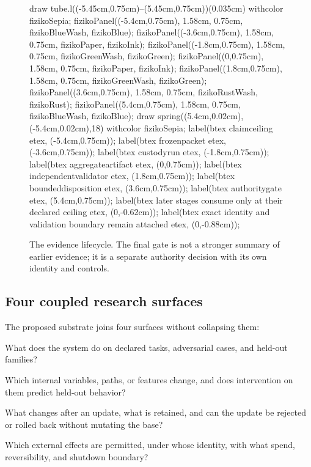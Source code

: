 \documentclass[11pt,twoside]{article}
\begin{document}
\begin{figure}[t]
\centering
\mpfig
  draw tube.l((-5.45cm,0.75cm)--(5.45cm,0.75cm))(0.035cm) withcolor fizikoSepia;
  fizikoPanel((-5.4cm,0.75cm), 1.58cm, 0.75cm, fizikoBlueWash, fizikoBlue);
  fizikoPanel((-3.6cm,0.75cm), 1.58cm, 0.75cm, fizikoPaper, fizikoInk);
  fizikoPanel((-1.8cm,0.75cm), 1.58cm, 0.75cm, fizikoGreenWash, fizikoGreen);
  fizikoPanel((0,0.75cm), 1.58cm, 0.75cm, fizikoPaper, fizikoInk);
  fizikoPanel((1.8cm,0.75cm), 1.58cm, 0.75cm, fizikoGreenWash, fizikoGreen);
  fizikoPanel((3.6cm,0.75cm), 1.58cm, 0.75cm, fizikoRustWash, fizikoRust);
  fizikoPanel((5.4cm,0.75cm), 1.58cm, 0.75cm, fizikoBlueWash, fizikoBlue);
  draw spring((5.4cm,0.02cm),(-5.4cm,0.02cm),18) withcolor fizikoSepia;
  label(btex \vbox{\hbox{\scriptsize claim}\hbox{\scriptsize ceiling}} etex, (-5.4cm,0.75cm));
  label(btex \vbox{\hbox{\scriptsize frozen}\hbox{\scriptsize packet}} etex, (-3.6cm,0.75cm));
  label(btex \vbox{\hbox{\scriptsize custody}\hbox{\scriptsize run}} etex, (-1.8cm,0.75cm));
  label(btex \vbox{\hbox{\scriptsize aggregate}\hbox{\scriptsize artifact}} etex, (0,0.75cm));
  label(btex \vbox{\hbox{\scriptsize independent}\hbox{\scriptsize validator}} etex, (1.8cm,0.75cm));
  label(btex \vbox{\hbox{\scriptsize bounded}\hbox{\scriptsize disposition}} etex, (3.6cm,0.75cm));
  label(btex \vbox{\hbox{\scriptsize authority}\hbox{\scriptsize gate}} etex, (5.4cm,0.75cm));
  label(btex \scriptsize later stages consume only at their declared ceiling etex, (0,-0.62cm));
  label(btex \scriptsize exact identity and validation boundary remain attached etex, (0,-0.88cm));
\endmpfig
\caption{The evidence lifecycle. The final gate is not a stronger summary of earlier evidence; it is a separate authority decision with its own identity and controls.}
\label{fig:lifecycle}
\end{figure}

\subsection{Four coupled research surfaces}

  The proposed substrate joins four surfaces without collapsing them:

\begin{description}[leftmargin=1.65em,style=nextline]
  \item[Behavior.] What does the system do on declared tasks, adversarial cases, and held-out families?
  \item[Mechanism.] Which internal variables, paths, or features change, and does intervention on them predict held-out behavior?
  \item[Adaptation.] What changes after an update, what is retained, and can the update be rejected or rolled back without mutating the base?
  \item[Authority.] Which external effects are permitted, under whose identity, with what spend, reversibility, and shutdown boundary?
\end{description}
\end{document}
